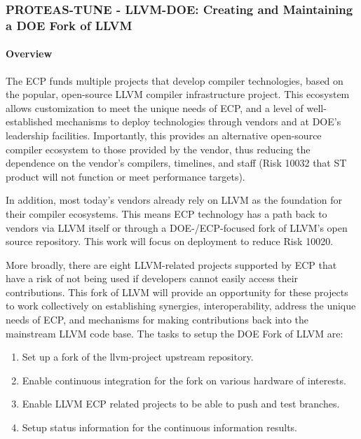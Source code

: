 \subsubsection{ PROTEAS-TUNE - LLVM-DOE: Creating and Maintaining a DOE Fork of LLVM}\label{s:llvm-doe}

\paragraph{Overview}

The ECP funds multiple projects that develop compiler technologies, based on the
popular, open-source LLVM compiler infrastructure project. This ecosystem allows
customization to meet the unique needs of ECP, and a level of well-established
mechanisms to deploy technologies through vendors and at DOE’s leadership
facilities. Importantly, this provides an alternative open-source compiler
ecosystem to those provided by the vendor, thus reducing the dependence on the
vendor’s compilers, timelines, and staff (Risk 10032 that ST product will not
function or meet performance targets).

In addition, most today’s vendors already rely on LLVM as the foundation for
their compiler ecosystems. This means ECP technology has a path back to vendors
via LLVM itself or through a DOE-/ECP-focused fork of LLVM’s open source
repository. This work will focus on deployment to reduce Risk 10020.

More broadly, there are eight LLVM-related projects supported by ECP that have
a risk of not being used if developers cannot easily access their contributions.
This fork of LLVM will provide an opportunity for these projects to work
collectively on establishing synergies, interoperability, address the unique
needs of ECP, and mechanisms for making contributions back into the mainstream
LLVM code base. The tasks to setup the DOE Fork of LLVM are:

\begin{enumerate}

\item Set up a fork of the llvm-project upstream repository.

\item Enable continuous integration for the fork on various hardware of
      interests.

\item Enable LLVM ECP related projects to be able to push and test branches.

\item Setup status information for the continuous information results.

\end{enumerate}


